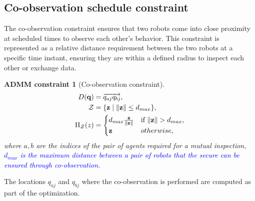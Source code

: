 \documentclass[10pt,twocolumn,twoside]{IEEEtran}
\newtheorem{constraint}{ADMM constraint}
\newcommand{\new}[1]{\textcolor{blue}{#1}}
\def\sZ{\mathcal{Z}}
\begin{document}

\subsection{Co-observation schedule constraint}\label{sec:co-observation-constraint}
The co-observation constraint ensures that two robots come into close proximity at scheduled times to observe each other's behavior. This constraint is represented as a relative distance requirement between the two robots at a specific time instant, ensuring they are within a defined radius to inspect each other or exchange data. %


\begin{constraint}[Co-observation constraint]\label{constraint:coobservation}
\begin{align}
D(\vq) &= \overrightarrow{q_{aj}q_{bj}}, \label{eq:coobservation_constraint}\\
  \sZ &= \{\vz \mid \norm{\vz} \leq d_{max} \},\\
   \Pi_\sZ(z) & = \begin{cases}
d_{max}\frac{\vz}{\norm{\vz}} &\text{if } \norm{\vz} > d_{max},\\
\vz	& otherwise,
\end{cases}
\end{align}
where $a,b$ are the indices of the pair of agents required for a mutual inspection, \new{$d_{max}$ is the maximum distance between a pair of robots that the secure can be ensured through co-observation.}
\end{constraint}
The locations $q_{aj}$ and $q_{bj}$ where the co-observation is performed are computed as part of the optimization.
\end{document}
